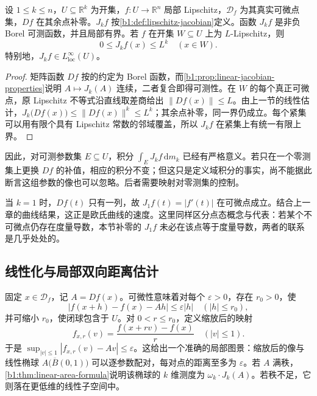 \begin{proposition}
\label{b1:prop:lipschitz-jacobian-borel}
设 \(1\le k\le n\)，\(U\subseteq\mathbb R^k\) 为开集，\(f:U\to\mathbb R^n\) 局部 Lipschitz，\(\mathcal D_f\) 为其真实可微点集，\(Df\) 在其余点补零。\(J_kf\) 按\cref{b1:def:lipschitz-jacobian}定义。函数 \(J_k f\) 是非负 Borel 可测函数，并且局部有界。若 \(f\) 在开集 \(W\subseteq U\) 上为 \(L\)-Lipschitz，则
\[
0\leq J_k f(x)\leq L^k\quad(x\in W).
\]
特别地，\(J_k f\in L^\infty_{\mathrm{loc}}(U)\)。
\end{proposition}
\begin{proof}
矩阵函数 \(Df\) 按的约定为 Borel 函数，而\cref{b1:prop:linear-jacobian-properties}说明 \(A\mapsto J_k(A)\) 连续，二者复合即得可测性。在 \(W\) 的每个真正可微点，原 Lipschitz 不等式沿直线取差商给出 \(\|Df(x)\|\leq L\)。由上一节的线性估计，\(J_k\bigl(Df(x)\bigr)\leq\|Df(x)\|^k\leq L^k\)；其余点补零，同一界仍成立。每个紧集可以用有限个具有 Lipschitz 常数的邻域覆盖，所以 \(J_k f\) 在紧集上有统一有限上界。
\end{proof}

因此，对可测参数集 \(E\subseteq U\)，积分 \(\int_EJ_k f\,\mathrm dm_k\) 已经有严格意义。若只在一个零测集上更换 \(Df\) 的补值，相应的积分不变；但这只是定义域积分的事实，尚不能据此断言这组参数的像也可以忽略。后者需要映射对零测集的控制。

\ProseParagraphBreak

当 \(k=1\) 时，\(Df(t)\) 只有一列，故 \(J_1f(t)=|f'(t)|\) 在可微点成立。结合上一章的曲线结果，这正是欧氏曲线的速度。这里同样区分点态概念与代表：若某个不可微点仍存在度量导数，本节补零的 \(J_1f\) 未必在该点等于度量导数，两者的联系是几乎处处的。

\subsection{线性化与局部双向距离估计}
\label{b1:subsec:170202}

固定 \(x\in\mathcal D_f\)，记 \(A=Df(x)\)。可微性意味着对每个 \(\varepsilon>0\)，存在 \(r_0>0\)，使
\[
|f(x+h)-f(x)-Ah|\leq\varepsilon|h|
\quad(|h|\leq r_0),
\]
并可缩小 \(r_0\)，使闭球包含于 \(U\)。对 \(0<r\leq r_0\)，定义缩放后的映射
\[
f_{x,r}(v)=\frac{f(x+rv)-f(x)}r
\quad(|v|\leq1).
\]
于是 \(\sup_{|v|\leq1}|f_{x,r}(v)-Av|\leq\varepsilon\)。这给出一个准确的局部图景：缩放后的像与线性椭球 \(A\bigl(\overline B(0,1)\bigr)\) 可以逐参数配对，每对点的距离至多为 \(\varepsilon\)。若 \(A\) 满秩，\cref{b1:thm:linear-area-formula}说明该椭球的 \(k\) 维测度为 \(\omega_k\cdot J_k(A)\)。若秩不足，它则落在更低维的线性子空间中。


